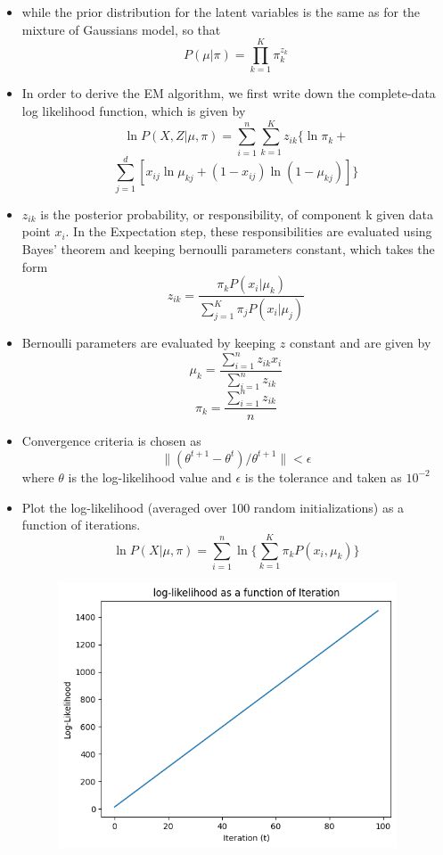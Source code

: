 \documentclass[12pt, a4paper]{article}
\begin{document}
\begin{itemize}
    \item while the prior distribution for the latent variables is the same as for the mixture of Gaussians model, so that
    \[P(\mu|\pi)=\prod\limits_{k=1}^{K}\pi_k^{z_k}\]

    \item In order to derive the EM algorithm, we first write down the complete-data log likelihood function, which is given by
    \[\ln P(X,Z|\mu,\pi)=\sum\limits_{i=1}^{n}\sum\limits_{k=1}^{K}z_{ik}\{\ln\pi_k+\] 
    \[\sum\limits_{j=1}^{d}[x_{ij}\ln\mu_{kj}+(1-x_{ij})\ln(1-\mu_{kj})]\}\]

    \item $z_{ik}$ is the posterior probability, or responsibility, of component k given data point $x_i$. In the Expectation step, these responsibilities are evaluated using Bayes' theorem and keeping bernoulli parameters constant, which takes the form
    \[z_{ik}=\frac{\pi_kP(x_i|\mu_k)}{\sum\limits_{j=1}^{K}\pi_jP(x_i|\mu_j)}\]

    \item Bernoulli parameters are evaluated by keeping $z$ constant and are given by
    \[\mu_k=\frac{\sum\limits_{i=1}^{n}z_{ik}x_{i}}{\sum\limits_{i=1}^{n}z_{ik}}\]
    \[\pi_k=\frac{\sum\limits_{i=1}^{n}z_{ik}}{n}\]

    \item Convergence criteria is chosen as 
    \[\|(\theta^{t+1}-\theta^t)/\theta^{t+1}\|<\epsilon\]
    where $\theta$ is the log-likelihood value and $\epsilon$ is the tolerance and taken as $10^{-2}$
    
    \item Plot the log-likelihood (averaged over 100 random initializations) as a function of iterations.
    \[\ln P(X|\mu,\pi)=\sum\limits_{i=1}^{n}\ln \{\sum\limits_{k=1}^{K}\pi_kP(x_i,\mu_k)\} \] 
    \newline
    \begin{figure}[ht]
        \centering
        \includegraphics[width=0.95\textwidth]{log-likelihood_bernoulli}
        \caption{}
        \label{fig:mesh2}
    \end{figure}
\end{itemize}
\newpage
\end{document}
